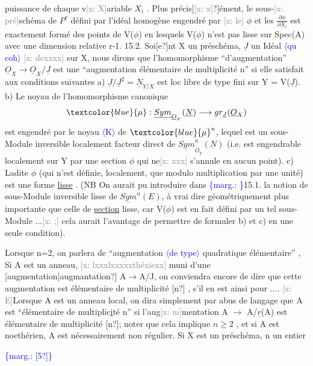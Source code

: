 \documentclass[11pt]{article}
\newcommand{\scanpage}[1]{\par\bigskip\noindent{\small\sffamily[scan #1]}\par}
\newcommand{\mspage}[1]{{\small\sffamily[p.\,#1]}}
\newcommand{\hand}[1]{\textcolor{blue}{#1}}
\newcommand{\inserted}[2][]{\textcolor{blue}{$\langle$#2$\rangle$}}
\newcommand{\margin}[1]{\textcolor{blue}{\{\textsf{marg.:} #1\}}}
\newcommand{\xout}[1]{\textcolor{gray}{[\textsf{x:} #1]}}
\newcommand{\uline}[1]{\underline{#1}}
\newcommand{\unsure}[1]{[#1?]}
\begin{document}
puissance de chaque v\xout{X}ariable $X_i$ . Plus précis\unsure{\xout{x}}ément, le sous-\xout{pré}schéma
de $P^r$ défini par l'idéal homogène engendré par \xout{le} $\phi$ et les $\frac{\partial\phi}{\partial X_i}$ est
exactement formé des points de V($\phi$) en lesquels V($\phi$) n'est pas lisse sur
Spec(A) avec une dimension relative r-1.
15.2. Soi\unsure{e}nt X un préschéma, $\underline{J}$ un Idéal \inserted{qu coh} \xout{dexxxx} sur X, nous dirons que
l'homomorphisme ``d'augmentation'' $\underline{O}_X \to \underline{O}_X/\underline{J}$ est une ``augmentation
élémentaire de multiplicité n'' si elle satisfait aux conditions suivantes
a) $\underline{J}/\underline{J}^2 = \underline{N}_{Y/X}$ est loc libre de type fini sur Y = V($\underline{J}$).
b) Le noyau de l'homomorphisme canonique
\[ \hand{\mu} : \underline{Sym}_{\underline{O}_Y}(\underline{N}) \longrightarrow gr_{\underline{J}}(\underline{O}_X) \]
est engendré par le noyau \inserted{K} de $\hand{\mu}^n$, lequel est un sous-Module inversible
localement facteur direct de $\underline{Sym}^n_{\underline{O}_Y}(\underline{N})$ (i.e. est engendrable localement
sur Y par une section $\phi$ qui ne\xout{xxx} s'annule en aucun point).
c) Ladite $\phi$ (qui n'est définie, localement, que modulo multiplication
par une unité) est une forme \uline{lisse} . (NB On aurait pu introduire dans
\margin{\textbar}15.1. la notion de sous-Module inversible lisse de $\underline{Sym}^n(E)$, à vrai dire
géométriquement plus importante que celle de \uline{section} lisse, car V($\phi$) est
en fait défini par un tel sous-Module ...\xout{;} cela aurait l'avantage de
permettre de formuler b) et c) en une seule condition).

Lorsque n=2, on parlera de ``augmentation \inserted{de type} quadratique élémentaire'' ,
Si A est un anneau, \xout{lxxxlxxxxxthéxiexx} muni d'une \unsure{augmentation|augmantation} A$\to$A/J,
on conviendra encore de dire que cette augmentation est élémentaire de
multiplicité \unsure{n} , s'il en est ainsi pour .... \xout{E}Lorsque A est un anneau
local, on dira simplement par abus de langage que A est ``élémentaire de
multiplic\uline{i}té n'' si l'aug\xout{m}mentation A $\to$ A/$\underline{r}$(A) est élémentaire de
multiplicité \unsure{n}; noter que cela implique $n \geqslant 2$ , et si A est noethérien,
A est nécessairement non régulier. Si X est un préschéma, n un entier

\mspage{161}

\clearpage
\scanpage{25/162}
\margin{\unsure{5}}
\end{document}
